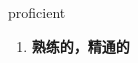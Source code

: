 
\begin{frame}
{\huge proficient}
\begin{center}
\begin{enumerate}\Large
  \item \textbf{熟练的，精通的}
\end{enumerate}
\end{center}
\end{frame}
